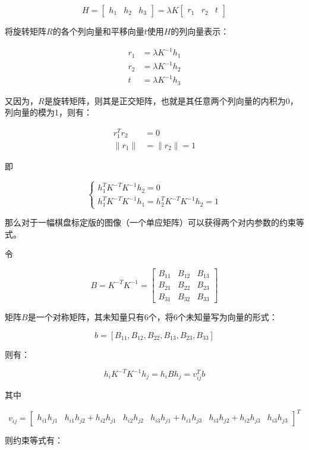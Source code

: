 \documentclass{lzureport}
\begin{document}
$$
H=\begin{bmatrix}
	h_1&h_2&h_3
	\end{bmatrix}=\lambda K\begin{bmatrix}
	r_1&r_2&t
\end{bmatrix}
$$

将旋转矩阵$R$的各个列向量和平移向量$t$使用$H$的列向量表示：

$$
\begin{aligned}
	r_1&=\lambda K^{-1}h_1\\
	r_2&=\lambda K^{-1}h_2\\
	t&=\lambda K^{-1}h_3
\end{aligned}
$$

又因为，$R$是旋转矩阵，则其是正交矩阵，也就是其任意两个列向量的内积为0，列向量的模为1，则有：

$$
\begin{aligned}
	r_1^Tr_2&=0\\
	\|r_1\|&=\|r_2\|=1
\end{aligned}
$$

即

$$
\left.\left\{\begin{array}{l}h_1^TK^{-T}K^{-1}h_2=0\\h_1^TK^{-T}K^{-1}h_1=h_2^TK^{-T}K^{-1}h_2=1\end{array}\right.\right.
$$

那么对于一幅棋盘标定版的图像（一个单应矩阵）可以获得两个对内参数的约束等式。

令

$$
B=K^{-T}K^{-1}=\begin{bmatrix}B_{11}&B_{12}&B_{13}\\B_{21}&B_{22}&B_{23}\\B_{31}&B_{32}&B_{33}\end{bmatrix}
$$

矩阵$B$是一个对称矩阵，其未知量只有6个，将6个未知量写为向量的形式：

$$
b=\left[B_{11},B_{12},B_{22},B_{13},B_{23},B_{33}\right]
$$

则有：

$$
h_{i}K^{-T}K^{-1}h_{j}=h_{i}Bh_{j}=v_{ij}^{T}b
$$

其中

$$
v_{ij}=\begin{bmatrix}
	h_{i1}h_{j1}&h_{i1}h_{j2}+h_{i2}h_{j1}&h_{i2}h_{j2}&h_{i3}h_{j1}+h_{i1}h_{j3}&h_{i3}h_{j2}+h_{i2}h_{j3}&h_{i3}h_{j3}
	\end{bmatrix}^T	
$$

则约束等式有：
\end{document}
